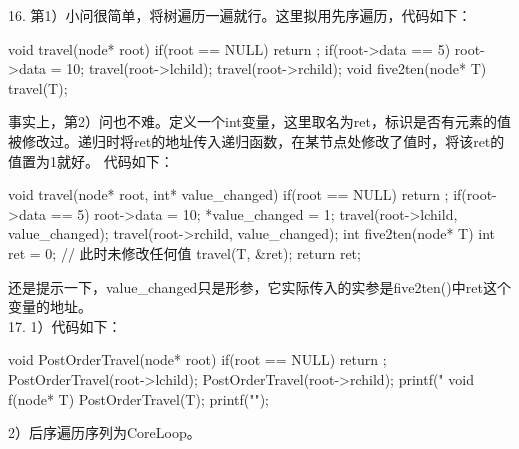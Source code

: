 \begin{exerciseanswer}
16. 第1）小问很简单，将树遍历一遍就行。这里拟用先序遍历，代码如下：

\begin{cppcode}
    void travel(node* root) {
        if(root == NULL) return ;
        if(root->data == 5) root->data = 10;
        travel(root->lchild);
        travel(root->rchild);
    }
    void five2ten(node* T) {
        travel(T);
    }
\end{cppcode}
事实上，第2）问也不难。定义一个int变量，这里取名为ret，标识是否有元素的值被修改过。递归时将ret的地址传入递归函数，在某节点处修改了值时，将该ret的值置为1就好。
代码如下：
\begin{cppcode}
    void travel(node* root, int* value_changed) {
        if(root == NULL) return ;
        if(root->data == 5) {
            root->data = 10;
            *value_changed = 1;
        }
        travel(root->lchild, value_changed);
        travel(root->rchild, value_changed);
    }
    int five2ten(node* T) {
        int ret = 0;    // 此时未修改任何值
        travel(T, &ret);
        return ret;
    }
\end{cppcode}
还是提示一下，value\_changed只是形参，它实际传入的实参是five2ten()中ret这个变量的地址。\\

17. 1）代码如下：
\begin{cppcode}
    void PostOrderTravel(node* root) {
        if(root == NULL) return ;
        PostOrderTravel(root->lchild);
        PostOrderTravel(root->rchild);
        printf("%
    }
    void f(node* T) {
        PostOrderTravel(T);
        printf("\n");
    }
\end{cppcode}
2）后序遍历序列为CoreLoop。\\


\end{exerciseanswer}
